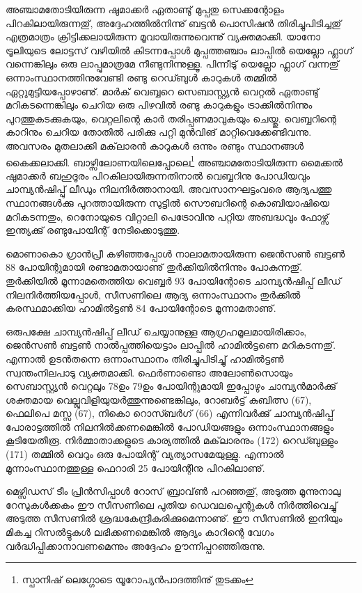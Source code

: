 അഞ്ചാമതോടിയിരുന്ന ഷുമാക്കര്‍ ഏതാണ്ടു് മുപ്പതു സെക്കന്റോളം പിറകിലായിരുന്നതു്, അദ്ദേഹത്തില്‍നിന്നു് ബട്ടന്‍ 
പൊസിഷന്‍ തിരിച്ചുപിടിച്ചതു് എത്രമാത്രം ക്രിട്ടിക്കലായിരുന്ന മൂവായിരുന്നുവെന്നു് വ്യക്തമാക്കി. യാനോ ട്രൂലിയുടെ 
ലോട്ടസ് വഴിയില്‍ കിടന്നപ്പോള്‍ മുപ്പത്തഞ്ചാം ലാപ്പില്‍ യെല്ലോ ഫ്ലാഗ് വന്നെങ്കിലും ഒരു ലാപ്പുമാത്രമേ നീണ്ടുനിന്നുള്ളൂ. 
പിന്നീടു് യെല്ലോ ഫ്ലാഗ് വന്നതു് ഒന്നാംസ്ഥാനത്തിനുവേണ്ടി രണ്ടു റെഡ്ബുള്‍ കാറുകള്‍ തമ്മില്‍ ഏറ്റുമുട്ടിയപ്പോഴാണു്. 
മാര്‍ക് വെബ്ബറെ സെബാസ്റ്റ്യന്‍ വെറ്റല്‍ ഏതാണ്ടു് മറികടന്നെങ്കിലും ചെറിയ ഒരു പിഴവില്‍ രണ്ടു കാറുകളും ട്രാക്കില്‍നിന്നും 
പുറത്തുകടക്കുകയും, വെറ്റലിന്റെ കാര്‍ തരിപ്പണമാവുകയും ചെയ്തു. വെബ്ബറിന്റെ കാറിനും ചെറിയ തോതില്‍ പരിക്കു 
പറ്റി മുന്‍വിങ് മാറ്റിവെക്കേണ്ടിവന്നു. അവസരം മുതലാക്കി മക്‌ലാരന്‍ കാറുകള്‍ ഒന്നും രണ്ടും സ്ഥാനങ്ങള്‍ കൈക്കലാക്കി. 
ബാഴ്സിലോണയിലെപ്പോലെ\footnote{സ്പാനിഷ് ലെഗ്ഗോടെ യൂറോപ്യന്‍പാദത്തിനു് തുടക്കം} അഞ്ചാമതോടിയിരുന്ന മൈക്കല്‍ ഷുമാക്കര്‍ ബഹുദൂരം 
പിറകിലായിരുന്നതിനാല്‍ വെബ്ബറിനു പോഡിയവും ചാമ്പ്യന്‍ഷിപ്പു് ലീഡും 
നിലനിര്‍ത്താനായി. അവസാനഘട്ടംവരെ ആദ്യപത്തു സ്ഥാനങ്ങള്‍ക്കു പുറത്തായിരുന്ന 
സുട്ടില്‍ സൌബറിന്റെ കൊബിയാഷിയെ മറികടന്നതും, റെനോയുടെ വിറ്റാലി പെട്രോവിനു പറ്റിയ അബദ്ധവും ഫോഴ്സ് 
ഇന്ത്യക്കു് രണ്ടുപോയിന്റ് നേടിക്കൊടുത്തു.

മൊണാകൊ ഗ്രാന്‍പ്രീ കഴിഞ്ഞപ്പോള്‍ നാലാമതായിരുന്ന ജെന്‍സണ്‍ ബട്ടണ്‍ 88 പോയിന്റുമായി രണ്ടാമതായാണു് 
തുര്‍ക്കിയില്‍നിന്നും പോകുന്നതു്. തുര്‍ക്കിയില്‍ മൂന്നാമതെത്തിയ വെബ്ബര്‍ 93 പോയിന്റോടെ ചാമ്പ്യന്‍ഷിപ്പ് ലീഡ് 
നിലനിര്‍ത്തിയപ്പോള്‍, സീസണിലെ ആദ്യ ഒന്നാംസ്ഥാനം തുര്‍ക്കില്‍ കരസ്ഥമാക്കിയ ഹാമില്‍ട്ടണ്‍ 84 പോയിന്റോടെ 
മൂന്നാമതാണു്.

ഒരുപക്ഷേ ചാമ്പ്യന്‍ഷിപ്പ് ലീഡ് ചെയ്യാനുള്ള ആഗ്രഹമൂലമായിരിക്കാം, ജെന്‍സണ്‍ ബട്ടണ്‍ നാല്‍പ്പത്തിയെട്ടാം ലാപ്പില്‍ 
ഹാമില്‍ട്ടണെ മറികടന്നതു്. എന്നാല്‍ ഉടന്‍തന്നെ ഒന്നാംസ്ഥാനം തിരിച്ചുപിടിച്ചു് ഹാമില്‍ട്ടണ്‍ സ്വന്തംനിലപാടു വ്യക്തമാക്കി.
ഫെര്‍ണാണ്ടൊ അലോണ്‍സൊയും സെബാസ്റ്റ്യന്‍ വെറ്റലും 78ഉം 79ഉം പോയിന്റുമായി ഇപ്പോഴും ചാമ്പ്യന്‍മാര്‍ക്കു് 
ശക്തമായ വെല്ലുവിളിയുയര്‍ത്തുന്നുണ്ടെങ്കിലും, റോബര്‍ട്ട് കുബിത്സ (67), ഫെലിപെ മസ്സ (67), നികൊ റൊസ്ബര്‍ഗ് (66)
എന്നിവര്‍ക്കു് ചാമ്പ്യന്‍ഷിപ്പ് പോരാട്ടത്തില്‍ നിലനില്‍ക്കണമെങ്കില്‍ പോഡിയങ്ങളും ഒന്നാംസ്ഥാനങ്ങളും കൂടിയേതീരൂ. 
നിര്‍മ്മാതാക്കളുടെ കാര്യത്തില്‍ മക്‌ലാരനും (172) റെഡ്ബുള്ളും (171) തമ്മില്‍ വെറും ഒരു പോയിന്റ് വ്യത്യാസമേയുള്ളു.
എന്നാല്‍ മൂന്നാംസ്ഥാനത്തുള്ള ഫെറാരി 25 പോയിന്റിനു പിറകിലാണു്.

മെഴ്സിഡസ് ടീം പ്രിന്‍സിപ്പാള്‍ റോസ് ബ്രാവ്‌ണ്‍ പറഞ്ഞതു്, അടുത്ത മൂന്നുനാലു റേസുകള്‍ക്കകം ഈ സീസണിലെ പുതിയ
ഡെവലപ്മെന്റുകള്‍ നിര്‍ത്തിവെച്ചു് അടുത്ത സീസണില്‍ ശ്രദ്ധകേന്ദ്രീകരിക്കുമെന്നാണു്. ഈ സീസണില്‍ ഇനിയും മികച്ച 
റിസല്‍ട്ടുകള്‍ ലഭിക്കണമെങ്കില്‍ ആദ്യം കാറിന്റെ വേഗം വര്‍ദ്ധിപ്പിക്കാനാവണമെന്നും അദ്ദേഹം ഊന്നിപ്പറഞ്ഞിരുന്നു.

